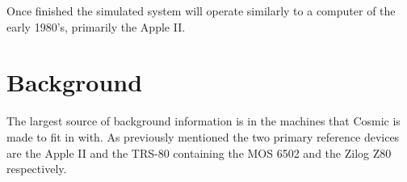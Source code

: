 \documentclass[conference]{IEEEtran}
\begin{document}
Once finished the simulated system will operate similarly to a computer of the early 1980's, primarily the Apple II. 

\section{Background}

The largest source of background information is in the machines that Cosmic is made to fit in with. As previously mentioned the two primary reference devices are the Apple II and the TRS-80 containing the MOS 6502 and the Zilog Z80 respectively. 
\end{document}
